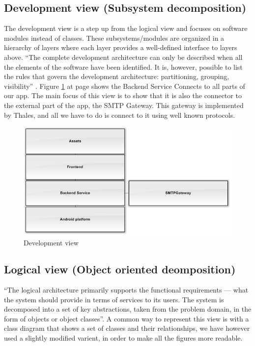 \subsection{Development view (Subsystem decomposition)}
The development view is a step up from the logical view and focuses on software modules instead of classes. These subsystems/modules are organized in a hierarchy of layers where each layer provides a well-defined interface to layers above. ``The complete development architecture can only be described when all the elements of the software have been identified. It is, however, possible to list the rules that govern the development architecture: partitioning, grouping, visibility'' \cite{bib:vm}. 
Figure \ref{fig:developmentview} at page \pageref{fig:developmentview} shows the Backend Service Connects to all parts of our app. The main focus of this view is to show that it is also the connector to the external part of the app, the SMTP Gateway. This gateway is implemented by Thales, and all we have to do is connect to it using well known protocols.

\begin{figure}[H]
	\includegraphics[width=\textwidth]{developmentview.png}
	\caption{Development view}
	\label{fig:developmentview}
\end{figure}

\subsection{Logical view (Object oriented deomposition)}\label{ch:logicalview}
``The logical architecture primarily supports the functional requirements --- what the system should provide in terms of services to its users. The system is decomposed into a set of key abstractions, taken from the problem domain, in the form of objects or object classes''\cite{bib:vm}. A common way to represent this view is with a class diagram that shows a set of classes and their relationships, we have however used a slightly modified varient, in order to make all the figures more readable.\newline\newline
